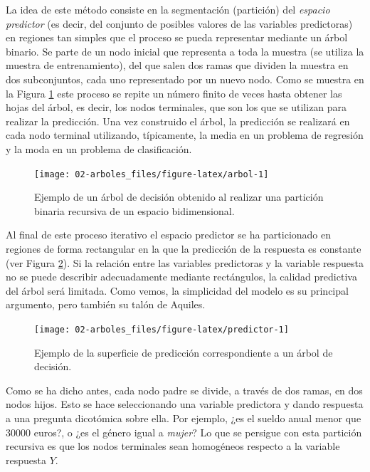 \documentclass[
]{book}
\theoremstyle{break}
\theoremstyle{nonumberplain}
\begin{document}
La idea de este método consiste en la segmentación (partición) del \emph{espacio predictor} (es decir, del conjunto de posibles valores de las variables predictoras) en regiones tan simples que el proceso se pueda representar mediante un árbol binario.
Se parte de un nodo inicial que representa a toda la muestra (se utiliza la muestra de entrenamiento), del que salen dos ramas que dividen la muestra en dos subconjuntos, cada uno representado por un nuevo nodo.
Como se muestra en la Figura \ref{fig:arbol} este proceso se repite un número finito de veces hasta obtener las hojas del árbol, es decir, los nodos terminales, que son los que se utilizan para realizar la predicción.
Una vez construido el árbol, la predicción se realizará en cada nodo terminal utilizando, típicamente, la media en un problema de regresión y la moda en un problema de clasificación.

\begin{figure}[!htb]

{\centering \texttt{[image: 02-arboles\_files/figure-latex/arbol-1]} 

}

\caption{Ejemplo de un árbol de decisión obtenido al realizar una partición binaria recursiva de un espacio bidimensional.}\label{fig:arbol}
\end{figure}

Al final de este proceso iterativo el espacio predictor se ha particionado en regiones de forma rectangular en la que la predicción de la respuesta es constante (ver Figura \ref{fig:predictor}).
Si la relación entre las variables predictoras y la variable respuesta no se puede describir adecuadamente mediante rectángulos, la calidad predictiva del árbol será limitada.
Como vemos, la simplicidad del modelo es su principal argumento, pero también su talón de Aquiles.

\begin{figure}[!htb]

{\centering \texttt{[image: 02-arboles\_files/figure-latex/predictor-1]} 

}

\caption{Ejemplo de la superficie de predicción correspondiente a un árbol de decisión.}\label{fig:predictor}
\end{figure}

Como se ha dicho antes, cada nodo padre se divide, a través de dos ramas, en dos nodos hijos.
Esto se hace seleccionando una variable predictora y dando respuesta a una pregunta dicotómica sobre ella.
Por ejemplo, ¿es el sueldo anual menor que 30000 euros?, o ¿es el género igual a \emph{mujer}?
Lo que se persigue con esta partición recursiva es que los nodos terminales sean homogéneos respecto a la variable respuesta \(Y\).
\end{document}
